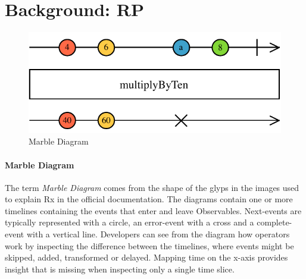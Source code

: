 \section{Background: RP}

\label{background}


\begin{figure}[t]
\centering
\includegraphics[width=\columnwidth]{images/marble-diagram.pdf}
\caption{Marble Diagram}
\label{marblediagram-image}
\end{figure}

\paragraph{Marble Diagram}
\label{marblediagram}
The term \textit{Marble Diagram} comes from the shape of the glyps in the images used to explain Rx in the official documentation. 
The diagrams contain one or more timelines containing the events that enter and leave Observables. 
Next-events are typically represented with a circle, an error-event with a cross and a complete-event with a vertical line.
Developers can see from the diagram how operators work by inspecting the difference between the timelines, 
where events might be skipped, added, transformed or delayed. 
Mapping time on the x-axis provides insight that is missing when inspecting only a single time slice. 